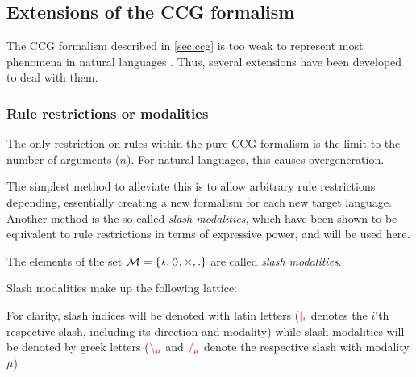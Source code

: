 \documentclass[main.tex]{subfiles}
\begin{document}
\subsection{ Extensions of the CCG formalism}
\label{sec:hacks}

The CCG formalism described in \ref{sec:ccg} is too weak to represent most
phenomena in natural languages \cite{steedman}. Thus, several extensions have
been developed to deal with them.

\subsubsection{Rule restrictions or modalities}
The only restriction on rules within the pure CCG formalism is the limit to
the number of arguments ($n$). For natural languages, this causes overgeneration.

The simplest method to alleviate this is to allow arbitrary rule restrictions
depending, essentially creating a new formalism for each new target language.
Another method is the so called \emph{slash modalities}, which have been shown
\cite{modal}
to be equivalent to rule restrictions in terms of expressive power, and will
be used here.

\begin{defn}
    The elements of the set
    $\mathcal{M} = \{ \star, \lozenge, \times, . \}$ are called
    \emph{slash modalities}.

    Slash modalities make up the following lattice:

    \begin{center}
    \end{center}
\end{defn}

For clarity, slash indices will be denoted with latin letters ($\textcolor{red}{|_{i}}$
denotes the $i$'th respective slash, including its direction and modality)
while slash modalities will be denoted by greek letters
($\textcolor{red}{\backslash_{\mu}}$ and  $\textcolor{red}{/_{\mu}}$ denote the respective
slash with modality $\mu$).
\end{document}
